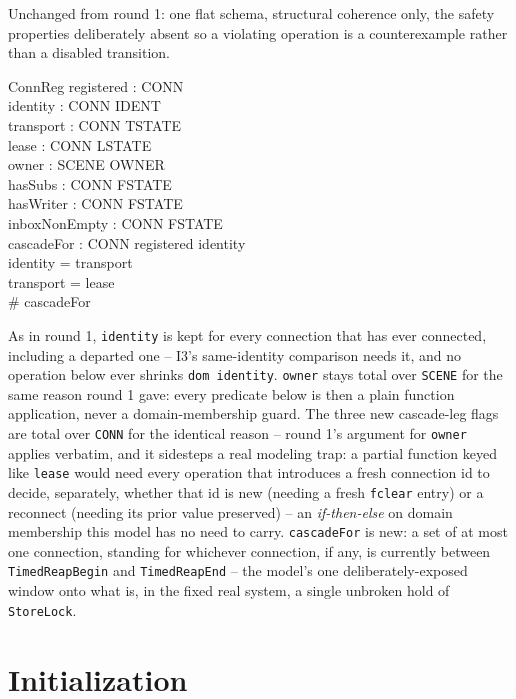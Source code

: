 \documentclass[a4paper,10pt,fleqn]{article}
\begin{document}
Unchanged from round 1: one flat schema, structural coherence only, the
safety properties deliberately absent so a violating operation is a
counterexample rather than a disabled transition.

\begin{schema}{ConnReg}
  registered : \power CONN \\
  identity : CONN \pfun IDENT \\
  transport : CONN \pfun TSTATE \\
  lease : CONN \pfun LSTATE \\
  owner : SCENE \fun OWNER \\
  hasSubs : CONN \fun FSTATE \\
  hasWriter : CONN \fun FSTATE \\
  inboxNonEmpty : CONN \fun FSTATE \\
  cascadeFor : \power CONN
\where
  registered \subseteq \dom identity \\
  \dom identity = \dom transport \\
  \dom transport = \dom lease \\
  \# cascadeFor 
\end{schema}

As in round 1, \texttt{identity} is kept for every connection that has
ever connected, including a departed one -- I3's same-identity comparison
needs it, and no operation below ever shrinks \texttt{dom identity}.
\texttt{owner} stays total over \texttt{SCENE} for the same reason round 1
gave: every predicate below is then a plain function application, never a
domain-membership guard. The three new cascade-leg flags are total over
\texttt{CONN} for the identical reason -- round 1's argument for
\texttt{owner} applies verbatim, and it sidesteps a real modeling trap: a
partial function keyed like \texttt{lease} would need every operation that
introduces a fresh connection id to decide, separately, whether that id is
new (needing a fresh \texttt{fclear} entry) or a reconnect (needing its
prior value preserved) -- an \emph{if-then-else} on domain membership this
model has no need to carry. \texttt{cascadeFor} is new: a set of at most
one connection, standing for whichever connection, if any, is currently
between \texttt{TimedReapBegin} and \texttt{TimedReapEnd} -- the model's
one deliberately-exposed window onto what is, in the fixed real system, a
single unbroken hold of \texttt{StoreLock}.

\section{Initialization}
\end{document}
